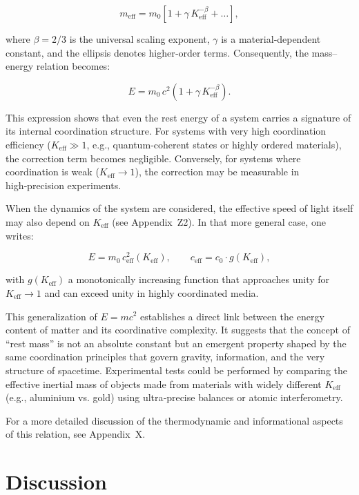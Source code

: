 \documentclass[12pt]{article}
\theoremstyle{remark}
\begin{document}
	\[
	m_{\mathrm{eff}} = m_{0} \left[ 1 + \gamma \, K_{\mathrm{eff}}^{-\beta} + \dots \right],
	\]
	
	where \(\beta = 2/3\) is the universal scaling exponent, \(\gamma\) is a material‑dependent constant, and the ellipsis denotes higher‑order terms. Consequently, the mass–energy relation becomes:
	
	\[
	\boxed{E = m_{0} \, c^{2} \left( 1 + \gamma \, K_{\mathrm{eff}}^{-\beta} \right)}.
	\]
	
	This expression shows that even the rest energy of a system carries a signature of its internal coordination structure. For systems with very high coordination efficiency (\(K_{\mathrm{eff}} \gg 1\), e.g., quantum‑coherent states or highly ordered materials), the correction term becomes negligible. Conversely, for systems where coordination is weak (\(K_{\mathrm{eff}} \to 1\)), the correction may be measurable in high‑precision experiments.
	
	When the dynamics of the system are considered, the effective speed of light itself may also depend on \(K_{\mathrm{eff}}\) (see Appendix~Z2). In that more general case, one writes:
	
	\[
	E = m_{0} \, c_{\mathrm{eff}}^{2}(K_{\mathrm{eff}}),\qquad
	c_{\mathrm{eff}} = c_{0} \cdot g(K_{\mathrm{eff}}),
	\]
	
	with \(g(K_{\mathrm{eff}})\) a monotonically increasing function that approaches unity for \(K_{\mathrm{eff}} \to 1\) and can exceed unity in highly coordinated media.
	
	This generalization of \(E = mc^{2}\) establishes a direct link between the energy content of matter and its coordinative complexity. It suggests that the concept of “rest mass” is not an absolute constant but an emergent property shaped by the same coordination principles that govern gravity, information, and the very structure of spacetime. Experimental tests could be performed by comparing the effective inertial mass of objects made from materials with widely different \(K_{\mathrm{eff}}\) (e.g., aluminium vs. gold) using ultra‑precise balances or atomic interferometry.
	
	For a more detailed discussion of the thermodynamic and informational aspects of this relation, see Appendix~X.
	
	\section{Discussion}
	\label{sec:discussion}
	
\end{document}
